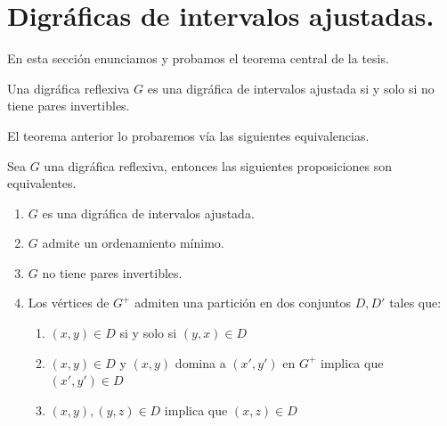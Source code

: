 \section{Digr\'aficas de intervalos ajustadas.}

En esta secci\'on enunciamos y probamos el teorema central de la tesis. 

\begin{teorema}
    Una digr\'afica reflexiva $G$ es una digr\'afica de intervalos ajustada si y
    solo si no tiene pares invertibles.
\end{teorema}

El teorema anterior lo probaremos vía las siguientes equivalencias.

 \begin{teorema}
     Sea $G$ una digr\'afica reflexiva, entonces las siguientes proposiciones
     son equivalentes.
\begin{enumerate}
  \item $G$ es una digr\'afica de intervalos ajustada.
  \item $G$ admite un ordenamiento mínimo.
  \item $G$ no tiene pares invertibles.
  \item Los v\'ertices de $G^+$ admiten una partici\'on en dos conjuntos $D, D'$ tales que:
        \begin{enumerate}
            \item $(x,y)\in D $ si y solo si $ (y,x) \in D$
            \item $(x,y)\in D$ y $(x,y)$ domina a $(x',y')$ en $G^+$ implica que $(x',y')\in D$
            \item $(x,y), (y,z)\in D$ implica que $(x,z)\in D$
        \end{enumerate}
\end{enumerate}

\end{teorema}

